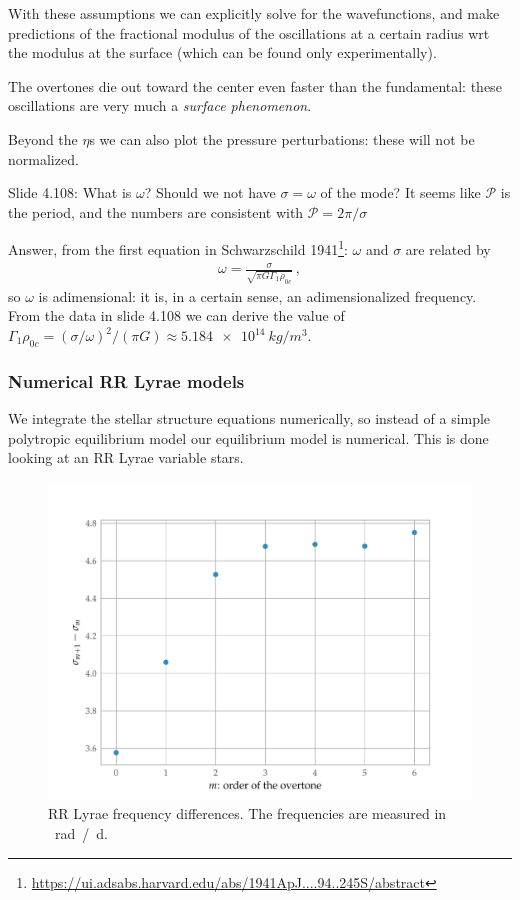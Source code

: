 \documentclass[main.tex]{subfiles}
\begin{document}
With these assumptions we can explicitly solve for the wavefunctions, and make predictions of the fractional modulus of the oscillations at a certain radius wrt the modulus at the surface (which can be found only experimentally).

The overtones die out toward the center even faster than the fundamental: these oscillations are very much a \emph{surface phenomenon}.

Beyond the \(\eta\)s we can also plot the pressure perturbations: these will not be normalized.

\begin{bluebox}
Slide 4.108: What is \(\omega \)? Should we not have \(\sigma = \omega \) of the mode? It seems like \(\mathcal{P}\) is the period, and the numbers are consistent with \(\mathcal{P} = 2 \pi / \sigma \)

Answer, from the first equation in Schwarzschild 1941\footnote{\url{https://ui.adsabs.harvard.edu/abs/1941ApJ....94..245S/abstract}}: \(\omega \) and \(\sigma \) are related by 
%
\begin{align}
  \omega = \frac{\sigma}{\sqrt{\pi G \Gamma_1 \rho_{0c}}}
  \,,
\end{align}
%
so \(\omega \) is adimensional: it is, in a certain sense, an adimensionalized frequency. From the data in slide 4.108 we can derive the value of \(\Gamma_1 \rho_{0c} = (\sigma / \omega )^2 / (\pi G) \approx \SI{5.184e14}{kg/m^3}\).
\end{bluebox}

\subsubsection{Numerical RR Lyrae models}

We integrate the stellar structure equations numerically, so instead of a simple polytropic equilibrium model our equilibrium model is numerical. 
This is done looking at an RR Lyrae variable stars.

\begin{figure}[ht]
\centering
\includegraphics[width=\textwidth]{figures/RR_Lyr_frequency_differences.pdf}
\caption{RR Lyrae frequency differences. The frequencies are measured in \SI{}{rad / d}.}
\label{fig:RR_Lyr_frequency_differences}
\end{figure}
\end{document}
